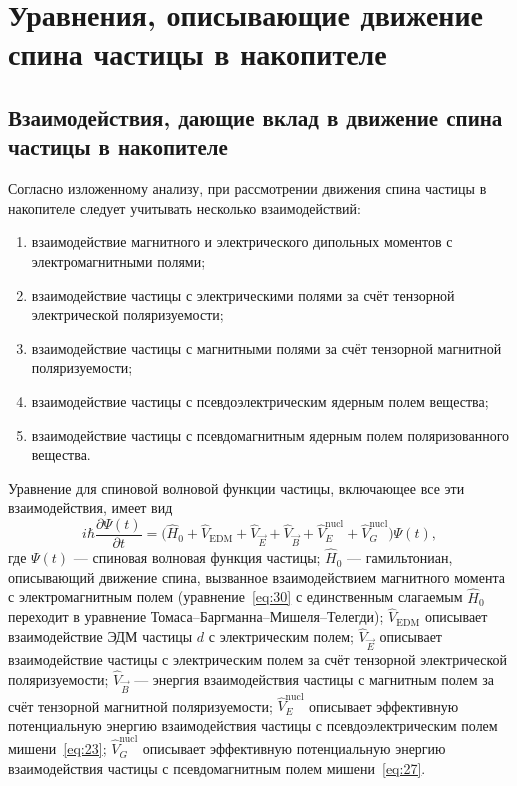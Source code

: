 \documentclass[11pt,a4paper]{article}
\begin{document}
\section{Уравнения, описывающие движение спина частицы в накопителе}

\subsection{Взаимодействия, дающие вклад в движение спина частицы
в накопителе}

Согласно изложенному анализу, при рассмотрении движения спина частицы
в накопителе следует учитывать несколько взаимодействий:
\begin{enumerate}
\item взаимодействие магнитного и электрического дипольных моментов
с электромагнитными полями;
\item взаимодействие частицы с электрическими полями за счёт тензорной
электрической поляризуемости;
\item взаимодействие частицы с магнитными полями за счёт тензорной
магнитной поляризуемости;
\item взаимодействие частицы с псевдоэлектрическим ядерным полем вещества;
\item взаимодействие частицы с псевдомагнитным ядерным полем
поляризованного вещества.
\end{enumerate}

Уравнение для спиновой волновой функции частицы, включающее все эти
взаимодействия, имеет вид
\begin{equation}
i\hbar\frac{\partial\Psi(t)}{\partial t}
=\bigl(
\hat{H}_0+\hat{V}_{\mathrm{EDM}}+\hat{V}_{\vec{E}}+\hat{V}_{\vec{B}}
+\hat{V}_E^{\mathrm{nucl}}+\hat{V}_G^{\mathrm{nucl}}
\bigr)\Psi(t),
\label{eq:30}
\end{equation}
где $\Psi(t)$ --- спиновая волновая функция частицы; $\hat{H}_0$ ---
гамильтониан, описывающий движение спина, вызванное взаимодействием
магнитного момента с электромагнитным полем (уравнение~\eqref{eq:30}
с единственным слагаемым $\hat{H}_0$ переходит в уравнение
Томаса--Баргманна--Мишеля--Телегди); $\hat{V}_{\mathrm{EDM}}$ описывает
взаимодействие ЭДМ частицы $d$ с электрическим полем; $\hat{V}_{\vec{E}}$
описывает взаимодействие частицы с электрическим полем за счёт тензорной
электрической поляризуемости; $\hat{V}_{\vec{B}}$ --- энергия взаимодействия
частицы с магнитным полем за счёт тензорной магнитной поляризуемости;
$\hat{V}_E^{\mathrm{nucl}}$ описывает эффективную потенциальную энергию
взаимодействия частицы с псевдоэлектрическим полем мишени~\eqref{eq:23};
$\hat{V}_G^{\mathrm{nucl}}$ описывает эффективную потенциальную энергию
взаимодействия частицы с псевдомагнитным полем мишени~\eqref{eq:27}.
\end{document}
